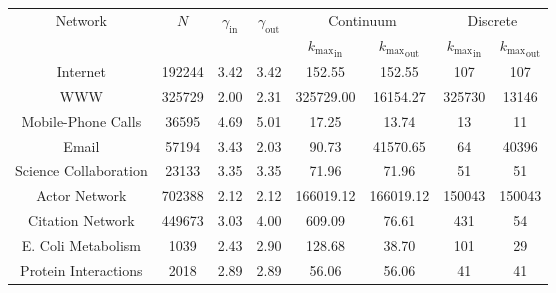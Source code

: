 \begin{tabular}{cccccccc}
\toprule\toprule
\multirow{2}{*}{Network} & \multirow{2}{*}{$N$} & \multirow{2}{*}{$\gamma_\text{in}$} & \multirow{2}{*}{$\gamma_\text{out}$} & \multicolumn{2}{c}{Continuum} & \multicolumn{2}{c}{Discrete} \\
& & & & ${k_{\max}}_\text{in}$ & ${k_{\max}}_\text{out}$ & ${k_{\max}}_\text{in}$ & ${k_{\max}}_\text{out}$ \\
\midrule
Internet & 192244 & 3.42 & 3.42 & 152.55 & 152.55 & 107 & 107 \\
WWW & 325729 & 2.00 & 2.31 & 325729.00 & 16154.27 & 325730 & 13146 \\
Mobile-Phone Calls & 36595 & 4.69 & 5.01 & 17.25 & 13.74 & 13 & 11 \\
Email & 57194 & 3.43 & 2.03 & 90.73 & 41570.65 & 64 & 40396 \\
Science Collaboration & 23133 & 3.35 & 3.35 & 71.96 & 71.96 & 51 & 51 \\
Actor Network & 702388 & 2.12 & 2.12 & 166019.12 & 166019.12 & 150043 & 150043 \\
Citation Network & 449673 & 3.03 & 4.00 & 609.09 & 76.61 & 431 & 54 \\
E. Coli Metabolism & 1039 & 2.43 & 2.90 & 128.68 & 38.70 & 101 & 29 \\
Protein Interactions & 2018 & 2.89 & 2.89 & 56.06 & 56.06 & 41 & 41 \\
\bottomrule\bottomrule
\end{tabular}
